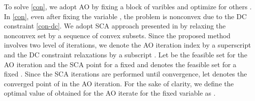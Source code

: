 To solve \eqref{con}, we adopt \ac{AO} by fixing a block of varibles and optimize for others \cite{bezdek2002some}. In \eqref{con}, even after fixing the variable \me{\my}, the problem is nonconvex due to the \ac{DC} constraint \eqref{con-dc}. We adopt \ac{SCA} approach presented in \cite{lipp2014variations,lanckriet2009convergence,scutari_1} by relaxing the nonconvex set by a sequence of convex subsets. Since the proposed method involves two level of iterations, we denote the \ac{AO} iteration index by a superscript  and the \ac{DC} constraint relaxations by a subscript . Let  be the feasible set for the  \ac{AO} iteration and the  \ac{SCA} point for a fixed \me{\my} and  denotes the feasible set for a fixed \me{\mx}. Since the \ac{SCA} iterations are performed until convergence, let  denotes the converged point of \me{\mx} in the  \ac{AO} iteration. For the sake of clarity, we define the optimal value of \me{\mz} obtained for the  \ac{AO} iterate for the fixed \me{\my} variable as .

